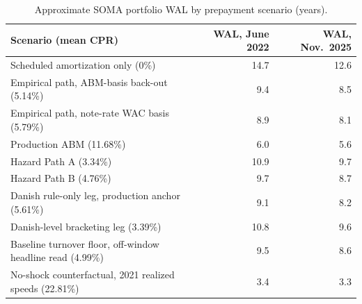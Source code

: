 \begin{table}[H]
\centering
\small
\begin{threeparttable}
\caption{Approximate SOMA portfolio WAL by prepayment scenario (years).}
\label{tab:wal}
\begin{tabular}{@{}lrr@{}}
\toprule
Scenario (mean CPR) & WAL, June 2022 & WAL, Nov.\ 2025 \\
\midrule
Scheduled amortization only (0\%) & 14.7 & 12.6 \\
Empirical path, ABM-basis back-out (5.14\%) & 9.4 & 8.5 \\
Empirical path, note-rate WAC basis (5.79\%) & 8.9 & 8.1 \\
Production ABM (11.68\%) & 6.0 & 5.6 \\
Hazard Path A (3.34\%) & 10.9 & 9.7 \\
Hazard Path B (4.76\%) & 9.7 & 8.7 \\
Danish rule-only leg, production anchor (5.61\%) & 9.1 & 8.2 \\
Danish-level bracketing leg (3.39\%) & 10.8 & 9.6 \\
Baseline turnover floor, off-window headline read (4.99\%) & 9.5 & 8.6 \\
No-shock counterfactual, 2021 realized speeds (22.81\%) & 3.4 & 3.3 \\
\bottomrule
\end{tabular}
\begin{tablenotes}[flushleft]\footnotesize

\end{tablenotes}
\end{threeparttable}
\end{table}

